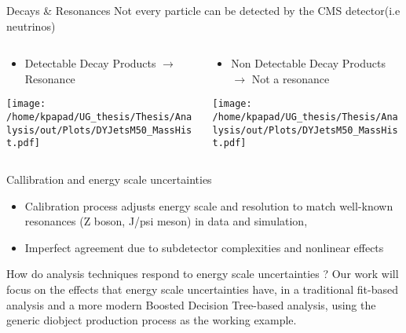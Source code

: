 \documentclass[bigger]{beamer}
\begin{document}
\begin{frame}[label={sec:orgfd1fc63}]{Decays \& Resonances}
Not every particle can be detected by the CMS detector(i.e neutrinos)
\begin{columns}
\begin{column}{0.5\columnwidth}
\begin{itemize}
\item Detectable Decay Products \(\rightarrow\) Resonance
\end{itemize}
\begin{center}
\texttt{[image: /home/kpapad/UG\_thesis/Thesis/Analysis/out/Plots/DYJetsM50\_MassHist.pdf]}
\end{center}
\end{column}

\begin{column}{0.5\columnwidth}
\begin{itemize}
\item Non Detectable Decay Products \(\rightarrow\) Not a resonance
\end{itemize}
\begin{center}
\texttt{[image: /home/kpapad/UG\_thesis/Thesis/Analysis/out/Plots/DYJetsM50\_MassHist.pdf]}
\end{center}
\end{column}
\end{columns}
\end{frame}

\begin{frame}[label={sec:org07876bd}]{Callibration and energy scale uncertainties}
\begin{itemize}
\item Calibration process adjusts energy scale and resolution to match well-known resonances (Z boson, J/psi meson) in data and simulation,
\end{itemize}
\begin{itemize}
\item Imperfect agreement due to subdetector complexities and nonlinear effects
\end{itemize}
\begin{block}{How do analysis techniques respond to energy scale uncertainties ?}
Our work will focus on the effects that energy scale uncertainties have, in a traditional fit-based analysis and a more modern Boosted Decision Tree-based analysis, using the generic diobject production process as the working example.
\end{block}
\end{frame}
\end{document}
